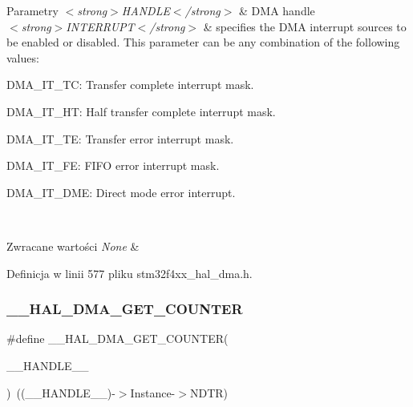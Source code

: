 \begin{DoxyParams}{Parametry}
{\em $<$strong$>$\+H\+A\+N\+D\+L\+E$<$/strong$>$} & D\+MA handle \\
\hline
{\em $<$strong$>$\+I\+N\+T\+E\+R\+R\+U\+P\+T$<$/strong$>$} & specifies the D\+MA interrupt sources to be enabled or disabled. This parameter can be any combination of the following values\+: \begin{DoxyItemize}
\item D\+M\+A\+\_\+\+I\+T\+\_\+\+TC\+: Transfer complete interrupt mask. \item D\+M\+A\+\_\+\+I\+T\+\_\+\+HT\+: Half transfer complete interrupt mask. \item D\+M\+A\+\_\+\+I\+T\+\_\+\+TE\+: Transfer error interrupt mask. \item D\+M\+A\+\_\+\+I\+T\+\_\+\+FE\+: F\+I\+FO error interrupt mask. \item D\+M\+A\+\_\+\+I\+T\+\_\+\+D\+ME\+: Direct mode error interrupt. \end{DoxyItemize}
\\
\hline
\end{DoxyParams}

\begin{DoxyRetVals}{Zwracane wartości}
{\em None} & \\
\hline
\end{DoxyRetVals}


Definicja w linii 577 pliku stm32f4xx\+\_\+hal\+\_\+dma.\+h.

\mbox{\label{group___d_m_a_ga082d691311bac96641dc35a17cfe8e63}} 
\subsubsection{\texorpdfstring{\+\_\+\+\_\+\+H\+A\+L\+\_\+\+D\+M\+A\+\_\+\+G\+E\+T\+\_\+\+C\+O\+U\+N\+T\+ER}{\_\_HAL\_DMA\_GET\_COUNTER}}
{\footnotesize\ttfamily \#define \+\_\+\+\_\+\+H\+A\+L\+\_\+\+D\+M\+A\+\_\+\+G\+E\+T\+\_\+\+C\+O\+U\+N\+T\+ER(\begin{DoxyParamCaption}\item[{}]{\+\_\+\+\_\+\+H\+A\+N\+D\+L\+E\+\_\+\+\_\+ }\end{DoxyParamCaption})~((\+\_\+\+\_\+\+H\+A\+N\+D\+L\+E\+\_\+\+\_\+)-\/$>$Instance-\/$>$N\+D\+TR)}



